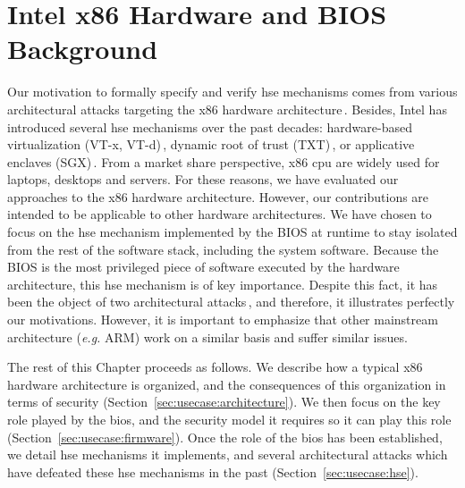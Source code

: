 \chapter{Intel x86 Hardware and BIOS Background}
\label{chapter:usecase}


\vspace{1cm}\noindent
%
Our motivation to formally specify and verify \ac{hse} mechanisms comes from
various architectural attacks targeting the x86 hardware
architecture\,\cite{duflot2009smram,wojtczuk2009smram,kallenberg2015racecondition,domas2015sinkhole,kovah2015senter}.
%
Besides, Intel has introduced several \ac{hse} mechanisms over the past decades:
hardware-based virtualization (VT-x, VT-d)\,\cite{intel2014manualvt}, dynamic
root of trust (TXT)\,\cite{intel2015txt}, or applicative enclaves
(SGX)\,\cite{intel2014manualsgx,costan2016sgxexplained}.
%
From a market share perspective, x86 \ac{cpu} are widely used for laptops,
desktops and servers.
%
For these reasons, we have evaluated our approaches to the x86 hardware
architecture.
%
However, our contributions are intended to be applicable to other hardware
architectures.
%
We have chosen to focus on the \ac{hse} mechanism implemented by the BIOS at
runtime to stay isolated from the rest of the software stack, including the
system software.
%
Because the BIOS is the most privileged piece of software executed by the
hardware architecture, this \ac{hse} mechanism is of key importance.
%
Despite this fact, it has been the object of two architectural 
attacks\,\cite{duflot2009smram,wojtczuk2009smram,domas2015sinkhole}, and
therefore, it illustrates perfectly our motivations.
%
However, it is important to emphasize that other mainstream architecture
(\emph{e.g.}  ARM) work on a similar basis and suffer similar issues.

The rest of this Chapter proceeds as follows.
%
We describe how a typical x86 hardware architecture is organized, and the
consequences of this organization in terms of security
(Section~\ref{sec:usecase:architecture}).
%
We then focus on the key role played by the \ac{bios}, and the security model it
requires so it can play this role (Section~\ref{sec:usecase:firmware}).
%
Once the role of the \ac{bios} has been established, we detail \ac{hse}
mechanisms it implements, and several architectural attacks which have defeated
these \ac{hse} mechanisms in the past (Section~\ref{sec:usecase:hse}).


